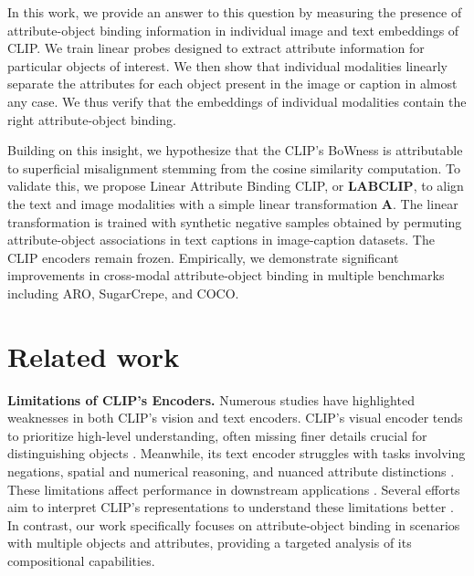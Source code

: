 In this work, we provide an answer to this question by measuring the presence of attribute-object binding information in individual image and text embeddings of CLIP. We train linear probes designed to extract attribute information for particular objects of interest. We then show that individual modalities linearly separate the attributes for each object present in the image or caption in almost any case. We thus verify that the embeddings of individual modalities contain the right attribute-object binding.

Building on this insight, we hypothesize that the CLIP's BoWness is attributable to superficial misalignment stemming from the cosine similarity computation. To validate this, we propose Linear Attribute Binding CLIP, or \textbf{LABCLIP}, to align the text and image modalities with a simple linear transformation \( \mathbf{A} \). The linear transformation is trained with synthetic negative samples obtained by permuting attribute-object associations in text captions in image-caption datasets. The CLIP encoders remain frozen. Empirically, we demonstrate significant improvements in cross-modal attribute-object binding in multiple benchmarks including ARO, SugarCrepe, and COCO. 


    












\section{Related work}



\noindent
\textbf{Limitations of CLIP's Encoders.} Numerous studies have highlighted weaknesses in both CLIP's vision and text encoders. CLIP's visual encoder tends to prioritize high-level understanding, often missing finer details crucial for distinguishing objects \cite{tong2024eyes}. Meanwhile, its text encoder struggles with tasks involving negations, spatial and numerical reasoning, and nuanced attribute distinctions \cite{tong2024mass, kamath2023text}. These limitations affect performance in downstream applications \cite{parashar2024neglected, tong2024eyes, tong2024mass}. Several efforts aim to interpret CLIP’s representations to understand these limitations better \cite{esfandiarpoor2024if, yun2023do, bhalla2024interpreting}.  In contrast, our work specifically focuses on attribute-object binding in scenarios with multiple objects and attributes, providing a targeted analysis of its compositional capabilities.

